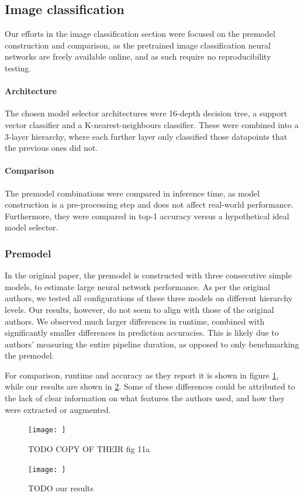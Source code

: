 \subsection{Image classification}

Our efforts in the image classification section were focused on the premodel construction and comparison, as the pretrained image classification neural networks are freely available online, and as such require no reproducibility testing. 
\paragraph{Architecture}
The chosen model selector architectures were 16-depth decision tree, a support vector classifier and a K-nearest-neighbours classifier. These were combined into a 3-layer hierarchy, where each further layer only classified those datapoints that the previous ones did not.
\paragraph{Comparison}
The premodel combinations were compared in inference time, as model construction is a pre-processing step and does not affect real-world performance. Furthermore, they were compared in top-1 accuracy versus a hypothetical ideal model selector.

\subsubsection{Premodel}
In the original paper, the premodel is constructed with three consecutive simple models, to estimate large neural network performance. As per the original authors, we tested all configurations of these three models on different hierarchy levels. Our results, however, do not seem to align with those of the original authors. We observed much larger differences in runtime, combined with significantly smaller differences in prediction accuracies. This is likely due to authors' measuring the entire pipeline duration, as opposed to only benchmarking the premodel.

For comparison, runtime and accuracy as they report it is shown in figure \ref{fig:11a_orig}, while our results are shown in \ref{fig:11a_ours}. Some of these differences could be attributed to the lack of clear information on what features the authors used, and how they were extracted or augmented. 
 
 \begin{figure}
    \centering
    \texttt{[image: ]}
    \caption{TODO COPY OF THEIR fig 11a}
    \label{fig:11a_orig}
\end{figure}
 \begin{figure}
    \centering
    \texttt{[image: ]}
    \caption{TODO our results}
    \label{fig:11a_ours}
\end{figure}

